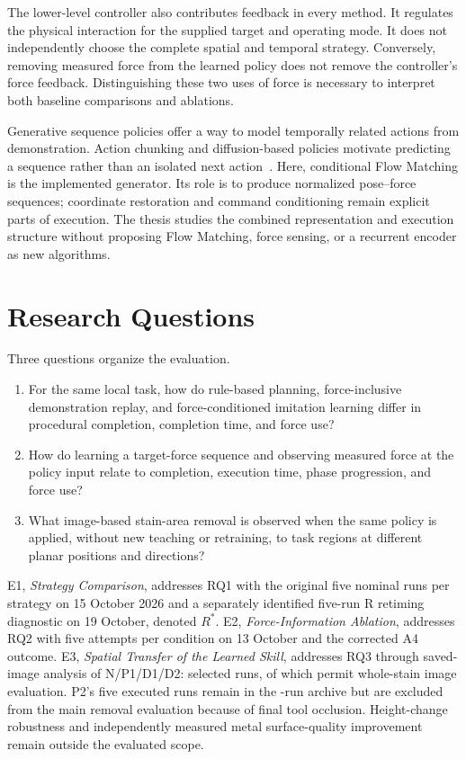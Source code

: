 The lower-level controller also contributes feedback in every method. It regulates the physical interaction for the supplied target and operating mode. It does not independently choose the complete spatial and temporal strategy. Conversely, removing measured force from the learned policy does not remove the controller's force feedback. Distinguishing these two uses of force is necessary to interpret both baseline comparisons and ablations.

Generative sequence policies offer a way to model temporally related actions from demonstration. Action chunking and diffusion-based policies motivate predicting a sequence rather than an isolated next action~\cite{zhao2023act,chi2023diffusionpolicy}. Here, conditional Flow Matching is the implemented generator. Its role is to produce normalized pose--force sequences; coordinate restoration and command conditioning remain explicit parts of execution. The thesis studies the combined representation and execution structure without proposing Flow Matching, force sensing, or a recurrent encoder as new algorithms.

\section{Research Questions}
Three questions organize the evaluation.
\begin{enumerate}[label=\textbf{RQ\arabic*:},leftmargin=1.8cm]
\item For the same local task, how do rule-based planning, force-inclusive demonstration replay, and force-conditioned imitation learning differ in procedural completion, completion time, and force use?
\item How do learning a target-force sequence and observing measured force at the policy input relate to completion, execution time, phase progression, and force use?
\item What image-based stain-area removal is observed when the same policy is applied, without new teaching or retraining, to task regions at different planar positions and directions?
\end{enumerate}
E1, \emph{Strategy Comparison}, addresses RQ1 with the original five nominal runs per strategy on 15 October 2026 and a separately identified five-run R retiming diagnostic on 19 October, denoted \(R^{*}\). E2, \emph{Force-Information Ablation}, addresses RQ2 with five attempts per condition on 13 October and the corrected A4 outcome. E3, \emph{Spatial Transfer of the Learned Skill}, addresses RQ3 through saved-image analysis of N/P1/D1/D2: \EthreeMainN{} selected runs, of which \EthreeImageN{} permit whole-stain image evaluation. P2's five executed runs remain in the \EthreeArchiveN{}-run archive but are excluded from the main removal evaluation because of final tool occlusion. Height-change robustness and independently measured metal surface-quality improvement remain outside the evaluated scope.

